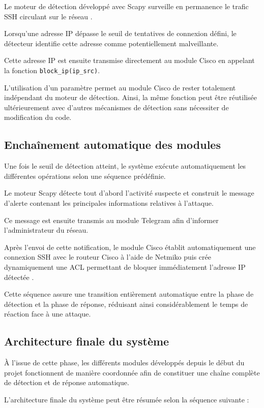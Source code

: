 Le moteur de détection développé avec Scapy surveille en permanence le trafic SSH circulant sur le réseau \cite{scapy_docs}.

Lorsqu'une adresse IP dépasse le seuil de tentatives de connexion défini, le détecteur identifie cette adresse comme potentiellement malveillante.

Cette adresse IP est ensuite transmise directement au module Cisco en appelant la fonction \texttt{block\_ip(ip\_src)}.

L'utilisation d'un paramètre permet au module Cisco de rester totalement indépendant du moteur de détection. Ainsi, la même fonction peut être réutilisée ultérieurement avec d'autres mécanismes de détection sans nécessiter de modification du code.

\subsection{Enchaînement automatique des modules}

Une fois le seuil de détection atteint, le système exécute automatiquement les différentes opérations selon une séquence prédéfinie.

Le moteur Scapy détecte tout d'abord l'activité suspecte et construit le message d'alerte contenant les principales informations relatives à l'attaque.

Ce message est ensuite transmis au module Telegram afin d'informer l'administrateur du réseau.

Après l'envoi de cette notification, le module Cisco établit automatiquement une connexion SSH avec le routeur Cisco à l'aide de Netmiko puis crée dynamiquement une ACL permettant de bloquer immédiatement l'adresse IP détectée \cite{netmiko_docs,cisco_ios}.

Cette séquence assure une transition entièrement automatique entre la phase de détection et la phase de réponse, réduisant ainsi considérablement le temps de réaction face à une attaque.

\subsection{Architecture finale du système}

À l'issue de cette phase, les différents modules développés depuis le début du projet fonctionnent de manière coordonnée afin de constituer une chaîne complète de détection et de réponse automatique.

L'architecture finale du système peut être résumée selon la séquence suivante :

